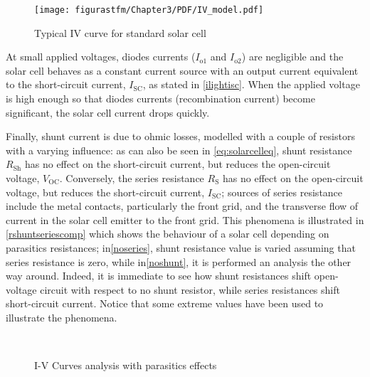 \begin{figure} [h] 				
				\centering
				\texttt{[image: figurastfm/Chapter3/PDF/IV\_model.pdf]}
				\caption{Typical IV curve for standard solar cell} \label{ivmodel}
			\end{figure}
			
			At small applied voltages, diodes currents ($ I_{\text{o1}} $ and $  I_{\text{o2}}  $) are negligible and the solar cell behaves as a constant current source with an output current equivalent to the short-circuit current, $ I_{\text{SC}} $, as stated in \autoref{ilightisc}. When the applied voltage is high enough so that diodes currents (recombination current) become significant, the solar cell current drops quickly.
			
			Finally, shunt current is due to ohmic losses, modelled with a couple of resistors with a varying influence: as can also be seen in \autoref{eq:solarcelleq}, shunt resistance $R_{\text{Sh}}$ has no effect on the short-circuit current, but reduces the open-circuit voltage, $V_{\text{OC}}$. Conversely, the series resistance $R_{\text{S}}$ has no effect on the open-circuit voltage, but reduces the short-circuit current, $I_{\text{SC}}$; sources of series resistance include the metal contacts, particularly the front grid, and the transverse flow of current in the solar cell emitter to the front grid. This phenomena is illustrated in \autoref{rshuntseriescomp} which shows the behaviour of a solar cell depending on parasitics resistances; in\autoref{noseries}, shunt resistance value is varied assuming that series resistance is zero, while in\autoref{noshunt}, it is performed an analysis the other way around. Indeed, it is immediate to see how shunt resistances shift open-voltage circuit with respect to no shunt resistor, while series resistances shift short-circuit current. Notice that some extreme values have been used to illustrate the phenomena. 
			
					
			\begin{figure}
					\centering		
							\\[3ex]
					\caption{I-V Curves analysis with parasitics effects} \label{rshuntseriescomp}
			\end{figure}
			
